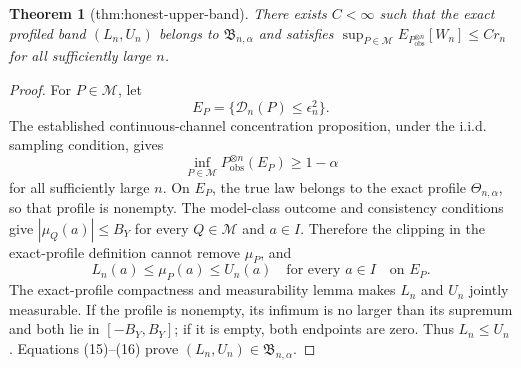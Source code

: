 \documentclass{article}
\newtheorem{theorem}{Theorem}
\begin{document}
\begin{theorem}[thm:honest-upper-band]\label{thm:honest-upper-band}
There exists \(C<\infty\) such that the exact profiled band \((L_n,U_n)\) belongs to \(\mathfrak B_{n,\alpha}\) and satisfies \(\sup_{P\in\mathcal M}E_{P_{\mathrm{obs}}^{\otimes n}}[W_n]\le C r_n\) for all sufficiently large \(n\).
\end{theorem}
\begin{proof}
For \(P\in\mathcal M\), let
\[
E_P=\{\mathscr D_n(P)\le\epsilon_n^2\}.
\]
The established continuous-channel concentration proposition, under the i.i.d. sampling condition, gives
\[
\inf_{P\in\mathcal M}P_{\mathrm{obs}}^{\otimes n}(E_P)\ge1-\alpha \tag{15}
\]
for all sufficiently large \(n\).  On \(E_P\), the true law belongs to the exact profile \(\Theta_{n,\alpha}\), so that profile is nonempty.  The model-class outcome and consistency conditions give \(|\mu_Q(a)|\le B_Y\) for every \(Q\in\mathcal M\) and \(a\in I\).  Therefore the clipping in the exact-profile definition cannot remove \(\mu_P\), and
\[
L_n(a)\le\mu_P(a)\le U_n(a)
\quad\text{for every }a\in I \quad\text{on }E_P. \tag{16}
\]
The exact-profile compactness and measurability lemma makes \(L_n\) and \(U_n\) jointly measurable.  If the profile is nonempty, its infimum is no larger than its supremum and both lie in \([-B_Y,B_Y]\); if it is empty, both endpoints are zero.  Thus \(L_n\le U_n\).  Equations (15)--(16) prove \((L_n,U_n)\in\mathfrak B_{n,\alpha}\).


\end{proof}
\end{document}
